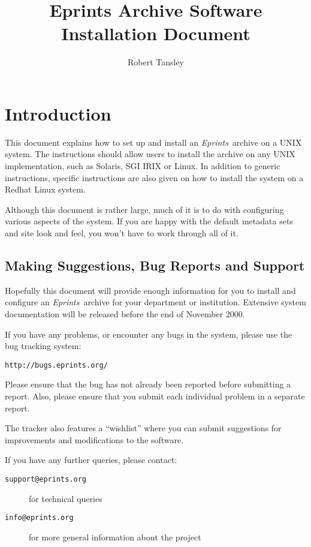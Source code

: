 \documentclass[a4paper]{article}
\title{Eprints Archive Software Installation Document}
\author{Robert Tansley}
\newcommand{\eprints}{\emph{Eprints}}
\begin{document}
\maketitle

\section{Introduction}

This document explains how to set up and install an \eprints\ archive on a UNIX system. The instructions should allow users to install the archive on any UNIX implementation, such as Solaris, SGI IRIX or Linux. In addition to generic instructions, specific instructions are also given on how to install the system on a Redhat Linux system.

Although this document is rather large, much of it is to do with configuring various aspects of the system. If you are happy with the default metadata sets and site look and feel, you won't have to work through all of it.


\subsection{Making Suggestions, Bug Reports and Support}

Hopefully this document will provide enough information for you to install and configure an \eprints\ archive for your department or institution. Extensive system documentation will be released before the end of November 2000.

If you have any problems, or encounter any bugs in the system, please use the bug tracking system:

\begin{verbatim}
http://bugs.eprints.org/
\end{verbatim}

Please ensure that the bug has not already been reported before submitting a report. Also, please ensure that you submit each individual problem in a separate report.

The tracker also features a ``wishlist'' where you can submit suggestions for improvements and modifications to the software.

If you have any further queries, please contact:

\begin{description}
\item[{\tt support@eprints.org}] for technical queries
\item[{\tt info@eprints.org}] for more general information about the project
\end{description}
\end{document}
